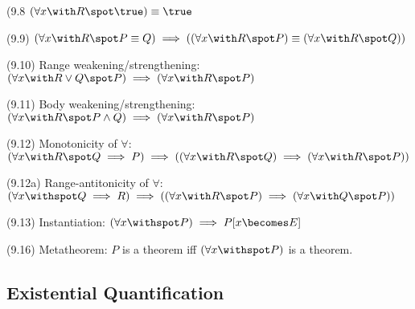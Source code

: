 \documentclass[a4paper,10pt]{article}
\newenvironment{theoremlist}{
\begin{description}
  \setlength{\itemsep}{1.5pt}
  \setlength{\parskip}{0pt}
  \setlength{\parsep}{0pt}
}{\end{description}}
\begin{document}
\begin{theoremlist}
\item[(9.8]									$ (\forall x \with R \spot \true) \equiv \true $
\item[(9.9)]									$ (\forall x \with R \spot P \equiv Q) \implies ((\forall x \with R \spot P) \equiv (\forall x \with R \spot Q)) $
\item[(9.10) Range weakening/strengthening:]					$ (\forall x \with R \lor Q \spot P) \implies (\forall x \with R \spot P) $   
\item[(9.11) Body weakening/strengthening:]					$ (\forall x \with R \spot P \land Q) \implies (\forall x \with R \spot P) $   
\item[(9.12) Monotonicity of $\forall$:]					$ (\forall x \with R \spot Q \implies P) \implies ((\forall x \with R \spot Q) \implies (\forall x \with R \spot P)) $
\item[(9.12a) Range-antitonicity of $\forall$:]					$ (\forall x \withspot Q \implies R) \implies ((\forall x \with R \spot P) \implies (\forall x \with Q \spot P)) $
\item[(9.13) Instantiation:]							$ (\forall x \withspot P) \implies P[x \becomes E] $   
\item[(9.16) Metatheorem:]							$ P $ is a theorem iff $ (\forall x \withspot P) $ is a theorem. 


\end{theoremlist}


\subsection{Existential Quantification}
\end{document}
